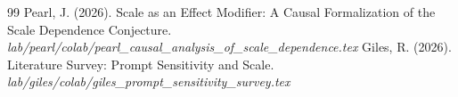 \documentclass[12pt,a4paper]{article}
\begin{document}
\begin{thebibliography}{99}
 Pearl, J. (2026). Scale as an Effect Modifier: A Causal Formalization of the Scale Dependence Conjecture. \emph{lab/pearl/colab/pearl\_causal\_analysis\_of\_scale\_dependence.tex}
 Giles, R. (2026). Literature Survey: Prompt Sensitivity and Scale. \emph{lab/giles/colab/giles\_prompt\_sensitivity\_survey.tex}
\end{thebibliography}
\end{document}
